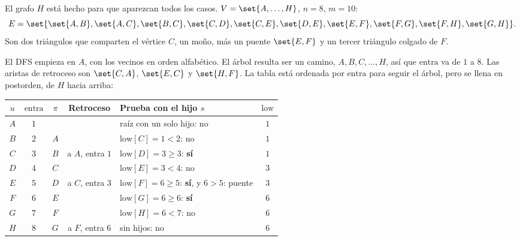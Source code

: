 \documentclass[11pt,letterpaper]{article}
\begin{document}
\begin{ejemplo}
  \label{ej:articulaciones-mono}
  El grafo $H$ está hecho para que aparezcan todos los casos.
  $V = \set{A, \dots, H}$, $n = 8$, $m = 10$:
  \[
    E = \set{\set{A,B}, \set{A,C}, \set{B,C}, \set{C,D}, \set{C,E},
             \set{D,E}, \set{E,F}, \set{F,G}, \set{F,H}, \set{G,H}} .
  \]
  Son dos triángulos que comparten el vértice $C$, un moño, más un
  puente $\set{E, F}$ y un tercer triángulo colgado de $F$.

  El DFS empieza en $A$, con los vecinos en orden alfabético. El árbol
  resulta ser un camino, $A, B, C, \dots, H$, así que $\text{entra}$ va
  de $1$ a $8$. Las aristas de retroceso son $\set{C, A}$,
  $\set{E, C}$ y $\set{H, F}$. La tabla está ordenada por
  $\text{entra}$ para seguir el árbol, pero se llena en postorden, de
  $H$ hacia arriba:
  \begin{center}
  \small
  \begin{tabular}{cccclc}
    \toprule
    $u$ & $\text{entra}$ & $\pi$ & \textbf{Retroceso}
      & \textbf{Prueba con el hijo $s$} & $\text{low}$ \\
    \midrule
    $A$ & $1$ & & & raíz con un solo hijo: no & $1$ \\
    $B$ & $2$ & $A$ & & $\text{low}[C] = 1 < 2$: no & $1$ \\
    $C$ & $3$ & $B$ & a $A$, entra $1$ & $\text{low}[D] = 3 \ge 3$:
      \textbf{sí} & $1$ \\
    $D$ & $4$ & $C$ & & $\text{low}[E] = 3 < 4$: no & $3$ \\
    $E$ & $5$ & $D$ & a $C$, entra $3$ & $\text{low}[F] = 6 \ge 5$:
      \textbf{sí}, y $6 > 5$: puente & $3$ \\
    $F$ & $6$ & $E$ & & $\text{low}[G] = 6 \ge 6$: \textbf{sí} & $6$ \\
    $G$ & $7$ & $F$ & & $\text{low}[H] = 6 < 7$: no & $6$ \\
    $H$ & $8$ & $G$ & a $F$, entra $6$ & sin hijos: no & $6$ \\
    \bottomrule
  \end{tabular}
  \end{center}
  \begin{center}
\end{center}
\end{ejemplo}
\end{document}
